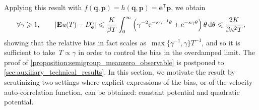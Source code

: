 \documentclass[11pt,a4paper]{article}
\newcommand{\e}{\mathrm{e}}
\newcommand{\expect}[0]{\mathbf{E}}
\newcommand{\vect}[1]{\boldsymbol{\mathbf #1}}
\renewcommand{\d}{\mathrm d}
\renewcommand{\t}{\mathsf T}
\theoremstyle{plain}
\numberwithin{equation}{section}
\renewcommand{\leq}{\leqslant}
\renewcommand{\geq}{\geqslant}
\begin{document}
Applying this result with $f(\vect q, \vect p) = h(\vect q, \vect p) = \vect e^\t \vect p$, we obtain
\begin{equation}
    \label{eq:refined_bound_for_u}
    \forall \gamma \geq 1, \qquad
    \abs{\expect u(T) - D^{\gamma}_{\vect e}}
    \leq \frac{K}{\beta T} \int_{0}^{\infty} \left( \gamma^{-2} \e^{- \kappa \gamma^{-1} \theta} + \e^{-\kappa  \gamma \theta} \right)  \theta \, \d \theta
    \leq \frac{2K}{\beta \kappa^2 T},
\end{equation}
showing that the relative bias in fact scales as~$\max\{\gamma^{-1}, \gamma\} T^{-1}$,
and so it is sufficient to take~$T \propto \gamma$ in order to control the bias in the overdamped limit.
The proof of \cref{proposition:semigroup_meanzero_observable} is postponed to \cref{sec:auxiliary_technical_results}.
In this section,
we motivate the result by scrutinizing two settings where
explicit expressions of the bias, or of the velocity auto-correlation function,
can be obtained:
constant potential and quadratic potential.
\end{document}
